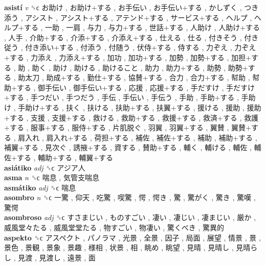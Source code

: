 \textbf{asistí} \emph{v}  ␝ϲ   お助け ,  お助け+する ,  お手伝い ,  お手伝い+する ,  かしずく ,  つき添う ,  アシスト ,  アシスト+する ,  アテンド+する ,  サービス+する ,  ヘルプ ,  ヘルプ+する ,  一助 ,  一肩 ,  与力 ,  与力+する ,  世話+する ,  人助け ,  人助け+する ,  人手 ,  介助+する ,  介添+する ,  介添え+する ,  仕える ,  仕る ,  付きそう ,  付き従う ,  付き添い+する ,  付添う ,  付随う ,  伏侍+する ,  侍する ,  力ぞえ ,  力ぞえ+する ,  力添え ,  力添え+する ,  加功 ,  加功+する ,  加勢 ,  加勢+する ,  加担+する ,  助 ,  助く ,  助け ,  助ける ,  助けること ,  助力 ,  助力+する ,  助勢 ,  助勢+する ,  助太刀 ,  助成+する ,  勤仕+する ,  協賛+する ,  合力 ,  合力+する ,  幇助 ,  幇助+する ,  御手伝い ,  御手伝い+する ,  応援 ,  応援+する ,  手だすけ ,  手だすけ+する ,  手つだい ,  手つだう ,  手伝 ,  手伝い ,  手伝う ,  手助 ,  手助+する ,  手助け ,  手助け+する ,  扶く ,  扶ける ,  扶助+する ,  扶翼+する ,  援ける ,  援助 ,  援助+する ,  支援 ,  支援+する ,  救ける ,  救助+する ,  救援+する ,  救済+する ,  救護+する ,  服事+する ,  服侍+する ,  片肌脱ぐ ,  羽翼 ,  羽翼+する ,  翼賛 ,  翼賛+する ,  肩入れ ,  肩入れ+する ,  荷担+する ,  補佐 ,  補佐+する ,  補助 ,  補助+する ,  補翼+する ,  見次ぐ ,  誘掖+する ,  資する ,  賛助+する ,  輔く ,  輔ける ,  輔佐 ,  輔佐+する ,  輔助+する ,  輔翼+する   \\
\textbf{asiátiko} \emph{adj}  ␝ϲ   アジア人   \\
\textbf{asma} \emph{n}  ␝ϲ   喘息 ,  気管支喘息   \\
\textbf{asmátiko} \emph{adj}  ␝ϲ   喘息   \\
\textbf{asombro} \emph{n}  ␝ϲ   一驚 ,  仰天 ,  吃驚 ,  喫驚 ,  愕 ,  愕き ,  驚 ,  驚がく ,  驚き ,  驚嘆 ,  驚愕   \\
\textbf{asombroso} \emph{adj}  ␝ϲ   すさまじい ,  ものすごい ,  凄い ,  凄じい ,  凄まじい ,  厳か ,  威風堂々たる ,  威風堂堂たる ,  物すごい ,  物凄い ,  驚くべき ,  驚異的   \\
\textbf{aspekto} ␝ϲ   アスペクト ,  パノラマ ,  光景 ,  全景 ,  因子 ,  局面 ,  展望 ,  情景 ,  景 ,  景色 ,  景観 ,  景象 ,  景趣 ,  様相 ,  状景 ,  相 ,  眺め ,  眺望 ,  見晴 ,  見晴し ,  見晴らし ,  見渡 ,  見渡し ,  遠景 ,  面   \\

